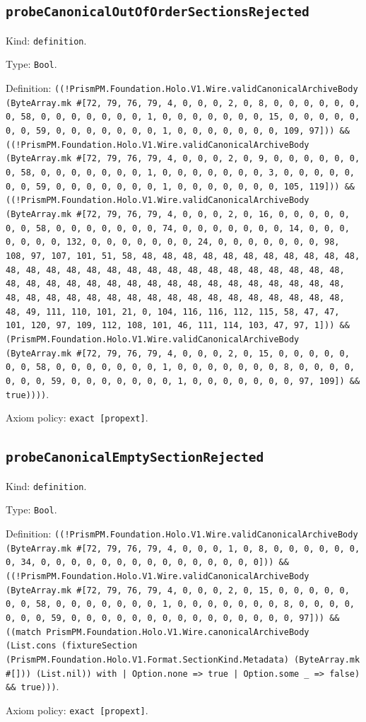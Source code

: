 \documentclass[11pt]{article}
\begin{document}
\subsection*{\texttt{probeCanonicalOutOfOrderSectionsRejected}}
\noindent Kind: \texttt{definition}.\par
\noindent Type: \texttt{Bool}.\par
\noindent Definition: \texttt{((!PrismPM.Foundation.Holo.V1.Wire.validCanonicalArchiveBody (ByteArray.mk \#[72, 79, 76, 79, 4, 0, 0, 0, 2, 0, 8, 0, 0, 0, 0, 0, 0, 0, 58, 0, 0, 0, 0, 0, 0, 0, 1, 0, 0, 0, 0, 0, 0, 0, 15, 0, 0, 0, 0, 0, 0, 0, 59, 0, 0, 0, 0, 0, 0, 0, 1, 0, 0, 0, 0, 0, 0, 0, 109, 97])) \&\& ((!PrismPM.Foundation.Holo.V1.Wire.validCanonicalArchiveBody (ByteArray.mk \#[72, 79, 76, 79, 4, 0, 0, 0, 2, 0, 9, 0, 0, 0, 0, 0, 0, 0, 58, 0, 0, 0, 0, 0, 0, 0, 1, 0, 0, 0, 0, 0, 0, 0, 3, 0, 0, 0, 0, 0, 0, 0, 59, 0, 0, 0, 0, 0, 0, 0, 1, 0, 0, 0, 0, 0, 0, 0, 105, 119])) \&\& ((!PrismPM.Foundation.Holo.V1.Wire.validCanonicalArchiveBody (ByteArray.mk \#[72, 79, 76, 79, 4, 0, 0, 0, 2, 0, 16, 0, 0, 0, 0, 0, 0, 0, 58, 0, 0, 0, 0, 0, 0, 0, 74, 0, 0, 0, 0, 0, 0, 0, 14, 0, 0, 0, 0, 0, 0, 0, 132, 0, 0, 0, 0, 0, 0, 0, 24, 0, 0, 0, 0, 0, 0, 0, 98, 108, 97, 107, 101, 51, 58, 48, 48, 48, 48, 48, 48, 48, 48, 48, 48, 48, 48, 48, 48, 48, 48, 48, 48, 48, 48, 48, 48, 48, 48, 48, 48, 48, 48, 48, 48, 48, 48, 48, 48, 48, 48, 48, 48, 48, 48, 48, 48, 48, 48, 48, 48, 48, 48, 48, 48, 48, 48, 48, 48, 48, 48, 48, 48, 48, 48, 48, 48, 48, 49, 111, 110, 101, 21, 0, 104, 116, 116, 112, 115, 58, 47, 47, 101, 120, 97, 109, 112, 108, 101, 46, 111, 114, 103, 47, 97, 1])) \&\& (PrismPM.Foundation.Holo.V1.Wire.validCanonicalArchiveBody (ByteArray.mk \#[72, 79, 76, 79, 4, 0, 0, 0, 2, 0, 15, 0, 0, 0, 0, 0, 0, 0, 58, 0, 0, 0, 0, 0, 0, 0, 1, 0, 0, 0, 0, 0, 0, 0, 8, 0, 0, 0, 0, 0, 0, 0, 59, 0, 0, 0, 0, 0, 0, 0, 1, 0, 0, 0, 0, 0, 0, 0, 97, 109]) \&\& true))))}.\par
\noindent Axiom policy: \texttt{exact [propext]}.\par
\subsection*{\texttt{probeCanonicalEmptySectionRejected}}
\noindent Kind: \texttt{definition}.\par
\noindent Type: \texttt{Bool}.\par
\noindent Definition: \texttt{((!PrismPM.Foundation.Holo.V1.Wire.validCanonicalArchiveBody (ByteArray.mk \#[72, 79, 76, 79, 4, 0, 0, 0, 1, 0, 8, 0, 0, 0, 0, 0, 0, 0, 34, 0, 0, 0, 0, 0, 0, 0, 0, 0, 0, 0, 0, 0, 0, 0])) \&\& ((!PrismPM.Foundation.Holo.V1.Wire.validCanonicalArchiveBody (ByteArray.mk \#[72, 79, 76, 79, 4, 0, 0, 0, 2, 0, 15, 0, 0, 0, 0, 0, 0, 0, 58, 0, 0, 0, 0, 0, 0, 0, 1, 0, 0, 0, 0, 0, 0, 0, 8, 0, 0, 0, 0, 0, 0, 0, 59, 0, 0, 0, 0, 0, 0, 0, 0, 0, 0, 0, 0, 0, 0, 0, 97])) \&\& ((match PrismPM.Foundation.Holo.V1.Wire.canonicalArchiveBody (List.cons (fixtureSection (PrismPM.Foundation.Holo.V1.Format.SectionKind.Metadata) (ByteArray.mk \#[])) (List.nil)) with | Option.none => true | Option.some \_ => false) \&\& true)))}.\par
\noindent Axiom policy: \texttt{exact [propext]}.\par
\end{document}
